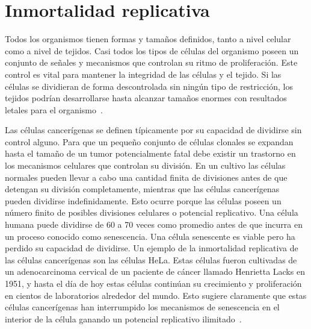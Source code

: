 \section{Inmortalidad replicativa}
\label{subsec-inm-rep}
Todos los organismos tienen formas y tama\~nos definidos, tanto a nivel celular como a nivel de tejidos. Casi todos los tipos de c\'elulas del organismo poseen un conjunto de se\~nales y mecanismos que controlan su ritmo de proliferaci\'on. Este control es vital para mantener la integridad de las c\'elulas y el tejido. Si las c\'elulas se dividieran de forma descontrolada sin ning\'un tipo de restricci\'on, los tejidos podr\'ian desarrollarse hasta alcanzar tama\~nos enormes con resultados letales para el organismo~\cite{hanahan}.

Las c\'elulas cancer\'igenas se definen t\'ipicamente por su capacidad de dividirse sin control alguno. Para que un peque\~no conjunto de c\'elulas clonales se expandan hasta el tama\~no de un tumor potencialmente fatal debe existir un trastorno en los mecanismos celulares que controlan su divisi\'on. En un cultivo las c\'elulas normales pueden llevar a cabo una cantidad finita de divisiones antes de que detengan su divisi\'on completamente, mientras que las c\'elulas cancer\'igenas pueden dividirse indefinidamente. Esto ocurre porque las c\'elulas poseen un n\'umero finito de posibles divisiones celulares o potencial replicativo. Una c\'elula humana puede dividirse de 60 a 70 veces como promedio antes de que incurra en un proceso conocido como senescencia. Una c\'elula senescente es viable pero ha perdido su capacidad de dividirse. Un ejemplo de la inmortalidad replicativa de las c\'elulas cancer\'igenas son las c\'elulas HeLa. Estas c\'elulas fueron cultivadas de un adenocarcinoma cervical de un paciente de c\'ancer llamado Henrietta Lacks en 1951, y hasta el d\'ia de hoy estas c\'elulas contin\'uan su crecimiento y proliferaci\'on en cientos de laboratorios alrededor del mundo. Esto sugiere claramente que estas c\'elulas cancer\'igenas han interrumpido los mecanismos de senescencia en el interior de la c\'elula ganando un potencial replicativo ilimitado~\cite{robins,hanahan,cancerbook}.

